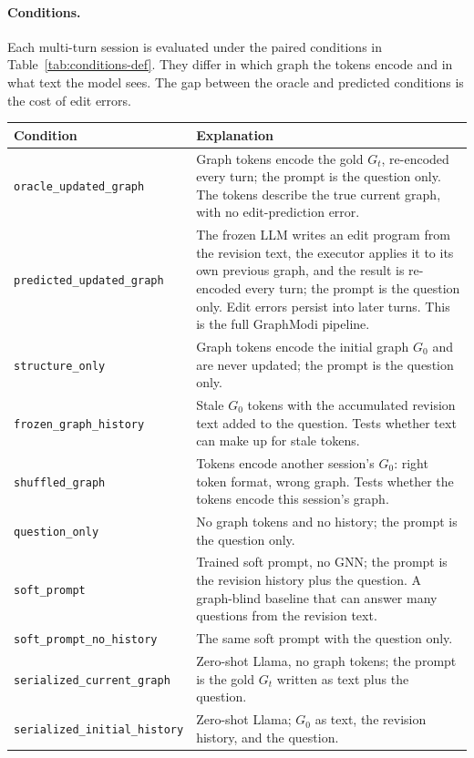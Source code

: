 \documentclass[11pt]{article}
\begin{document}
\paragraph{Conditions.}
Each multi-turn session is evaluated under the paired conditions in Table~\ref{tab:conditions-def}.
They differ in which graph the tokens encode and in what text the model sees.
The gap between the oracle and predicted conditions is the cost of edit errors.

\begin{table}[t]
\centering
\small
\renewcommand{\arraystretch}{1.15}
\begin{tabular}{@{}p{4.4cm}p{10.4cm}@{}}
\toprule
\textbf{Condition} & \textbf{Explanation} \\
\midrule
\texttt{oracle\_updated\_graph} & Graph tokens encode the gold $G_t$, re-encoded every turn; the prompt is the question only. The tokens describe the true current graph, with no edit-prediction error. \\
\texttt{predicted\_updated\_graph} & The frozen LLM writes an edit program from the revision text, the executor applies it to its own previous graph, and the result is re-encoded every turn; the prompt is the question only. Edit errors persist into later turns. This is the full GraphModi pipeline. \\
\texttt{structure\_only} & Graph tokens encode the initial graph $G_0$ and are never updated; the prompt is the question only. \\
\texttt{frozen\_graph\_history} & Stale $G_0$ tokens with the accumulated revision text added to the question. Tests whether text can make up for stale tokens. \\
\texttt{shuffled\_graph} & Tokens encode another session's $G_0$: right token format, wrong graph. Tests whether the tokens encode this session's graph. \\
\texttt{question\_only} & No graph tokens and no history; the prompt is the question only. \\
\texttt{soft\_prompt} & Trained soft prompt, no GNN; the prompt is the revision history plus the question. A graph-blind baseline that can answer many questions from the revision text. \\
\texttt{soft\_prompt\_no\_history} & The same soft prompt with the question only. \\
\texttt{serialized\_current\_graph} & Zero-shot Llama, no graph tokens; the prompt is the gold $G_t$ written as text plus the question. \\
\texttt{serialized\_initial\_history} & Zero-shot Llama; $G_0$ as text, the revision history, and the question. \\

\end{tabular}
\end{table}
\end{document}
